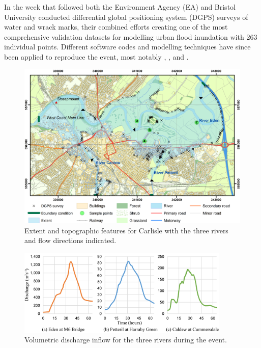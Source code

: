 In the week that followed both the Environment Agency (EA) and Bristol University conducted differential global positioning system (DGPS) surveys of water and wrack marks, their combined efforts creating one of the most comprehensive validation datasets for modelling urban flood inundation with 263 individual points. Different software codes and modelling techniques have since been applied to reproduce the event, most notably \citet{Neal2009}, \citet{Horritt2010}, \citet{Fewtrell2011a} and \citet{Liu2013}.

\begin{figure}[tpb]
\centering
\includegraphics[width=1.0\textwidth]{carlisle-figures/Figure3.png}
\caption{Extent and topographic features for Carlisle with the three rivers and flow directions indicated.}
\label{CarlisleMap}
\end{figure}
\begin{figure}[tpb]
\centering
\includegraphics[width=0.9\textwidth]{carlisle-figures/Figure4.png}
\caption{Volumetric discharge inflow for the three rivers during the event.}
\label{BoundaryDischarges}
\end{figure}

